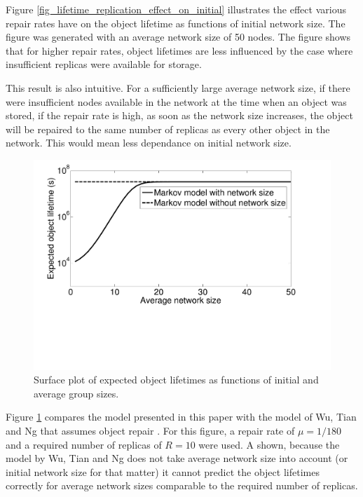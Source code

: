 \documentclass[10pt,a4paper,conference]{IEEEtran}
\begin{document}
Figure \ref{fig_lifetime_replication_effect_on_initial} illustrates the effect various repair rates have on the object lifetime as functions of initial network size. The figure was generated with an average network size of 50 nodes. The figure shows that for higher repair rates, object lifetimes are less influenced by the case where insufficient replicas were available for storage.

This result is also intuitive. For a sufficiently large average network size, if there were insufficient nodes available in the network at the time when an object was stored, if the repair rate is high, as soon as the network size increases, the object will be repaired to the same number of replicas as every other object in the network. This would mean less dependance on initial network size.

\begin{figure}[htbp]
 \centering
 \includegraphics[clip=true, viewport=1.0cm 6.5cm 26.5cm 20.5cm, width=0.9\columnwidth]{lifetime_av_models_compare}
 \caption{Surface plot of expected object lifetimes as functions of initial and average group sizes.}
 \label{fig_lifetime_vs_other_model}
\end{figure}

Figure \ref{fig_lifetime_vs_other_model} compares the model presented in this paper with the model of Wu, Tian and Ng that assumes object repair \cite{replication_article}. For this figure, a repair rate of $\mu = 1/180$ and a required number of replicas of $R = 10$ were used. A shown, because the model by Wu, Tian and Ng does not take average network size into account (or initial network size for that matter) it cannot predict the object lifetimes correctly for average network sizes comparable to the required number of replicas.
\end{document}
